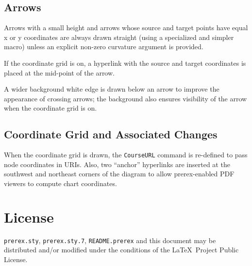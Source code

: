 \documentclass[11pt]{article}
\begin{document}
\subsection{Arrows}
Arrows with a small height and arrows whose
source and target points have equal x or y coordinates are always drawn straight
(using a specialized and simpler macro)  unless an explicit
non-zero curvature argument is provided.

If the coordinate grid is on, a hyperlink with the source and target coordinates is placed
at the mid-point of the arrow.

A wider background white edge is drawn below an arrow to 
improve the appearance
of crossing arrows; the background also
ensures visibility of the
arrow when the coordinate grid is on.

\subsection{Coordinate Grid and Associated Changes}
When the coordinate grid is drawn, the \texttt{CourseURL} command
is re-defined to pass node coordinates in URIs. Also,
two ``anchor'' hyperlinks are inserted at the southwest and northeast corners
of the diagram to allow prerex-enabled
PDF viewers to compute chart coordinates.

\section{License}
\verb|prerex.sty|, \verb|prerex.sty.7|, \verb|README.prerex| and this document may be distributed and/or modified under the
conditions of the \LaTeX\ Project Public License.
\end{document}
